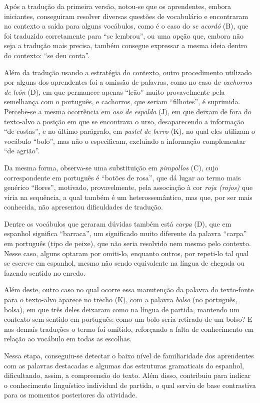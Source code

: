 \documentclass[portuguese]{textolivre}
\begin{document}
Após a tradução da primeira versão, notou-se que os aprendentes, embora iniciantes, conseguiram resolver diversas questões de vocabulário e encontraram no contexto a saída para alguns vocábulos, como é o caso do \textit{se acordó} 
 (B), que foi traduzido corretamente para “se lembrou”, ou uma opção que, embora não seja a tradução mais precisa, também consegue expressar a mesma ideia dentro do contexto: “se deu conta”.

Além da tradução usando a estratégia do contexto, outro procedimento utilizado por alguns dos aprendentes foi a omissão de palavras, como no caso de \textit{cachorros de león} (D), em que permanece apenas “leão” muito provavelmente pela semelhança com o português, e cachorros, que seriam “filhotes”, é suprimida. Percebe-se a mesma ocorrência em \textit{oso de espalda} (J), em que deixam de fora do texto-alvo a posição em que se encontrava o urso, desaparecendo a informação “de costas”, e no último parágrafo, em \textit{pastel de berro} (K), no qual eles utilizam o vocábulo “bolo”, mas não o especificam, excluindo a informação complementar “de agrião”.

Da mesma forma, observa-se uma substituição em \textit{pimpollos} (C), cujo correspondente em português é “botões de rosa”, que dá lugar ao termo mais genérico “flores”, motivado, provavelmente, pela associação à cor \textit{roja (rojos)} que viria na sequência, a qual também é um heterossemântico, mas que, por ser mais conhecida, não apresentou dificuldades de tradução.

Dentre os vocábulos que geraram dúvidas também está \textit{carpa} (D), que em espanhol significa “barraca”, um significado muito diferente da palavra “carpa” em português (tipo de peixe), que não seria resolvido nem mesmo pelo contexto. Nesse caso, alguns optaram por omiti-lo, enquanto outros, por repeti-lo tal qual se escreve em espanhol, mesmo não sendo equivalente na língua de chegada ou fazendo sentido no enredo.

Além deste, outro caso no qual ocorre essa manutenção da palavra do texto-fonte para o texto-alvo aparece no trecho (K), com a palavra \textit{bolso} (no português, bolsa), em que três deles deixaram como na língua de partida, mantendo um contexto sem sentido em português: como um bolo seria retirado de um bolso? E nas demais traduções o termo foi omitido, reforçando a falta de conhecimento em relação ao vocábulo em todas as escolhas.

Nessa etapa, conseguiu-se detectar o baixo nível de familiaridade dos aprendentes com as palavras destacadas e algumas das estruturas gramaticais do espanhol, dificultando, assim, a compreensão do texto. Além disso, contribuiu para indicar o conhecimento linguístico individual de partida, o qual serviu de base contrastiva para os momentos posteriores da atividade.
\end{document}
